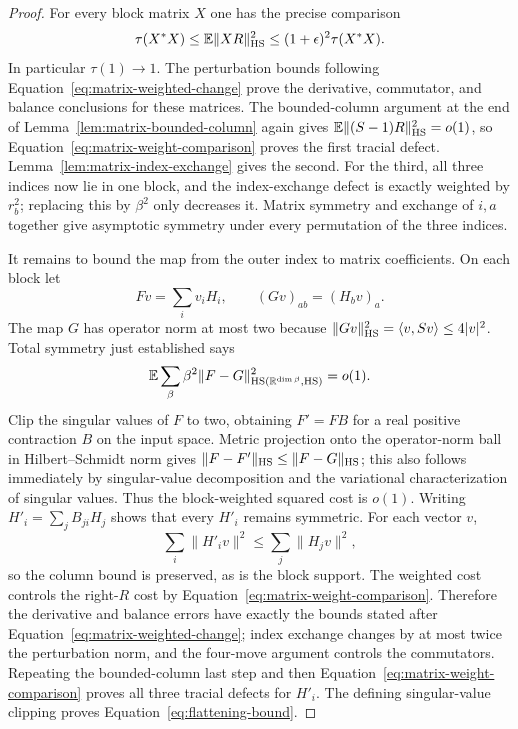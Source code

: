 \begin{proof}
For every block matrix $X$ one has the precise comparison
\begin{equation}\label{eq:matrix-weight-comparison}
 \tau(X^*X)\le\mathbb E\|XR\|_{\mathrm{HS}}^2
 \le(1+\epsilon)^2\tau(X^*X).
\end{equation}
In particular $\tau(1)\to1$.
The perturbation bounds following Equation~\eqref{eq:matrix-weighted-change}
prove the derivative, commutator, and balance conclusions for these
matrices.  The bounded-column argument at the end of
Lemma~\ref{lem:matrix-bounded-column} again gives
$\mathbb E\|(S-1)R\|_{\mathrm{HS}}^2=o(1)$, so
Equation~\eqref{eq:matrix-weight-comparison} proves the first tracial defect.
Lemma~\ref{lem:matrix-index-exchange} gives the second.  For the third,
all three indices now lie in one block, and the index-exchange defect
is exactly weighted by $r_b^2$; replacing this by $\beta^2$ only decreases
it.  Matrix symmetry and exchange of $i,a$ together give asymptotic
symmetry under every permutation of the three indices.

It remains to bound the map from the outer index to matrix coefficients.
On each block let
\[
 Fv=\sum_i v_iH_i,\qquad (Gv)_{ab}=(H_bv)_a.
\]
The map $G$ has operator norm at most two because
$\|Gv\|_{\mathrm{HS}}^2=\langle v,Sv\rangle\le4|v|^2$.
Total symmetry just established says
\[
 \mathbb E\sum_\beta\beta^2\|F-G\|_{\mathrm{HS}(\mathbb R^{\dim\beta},\mathrm{HS})}^2=o(1).
\]
Clip the singular values of $F$ to two, obtaining $F'=FB$ for a real
positive contraction $B$ on the input space.  Metric projection onto the
operator-norm ball in Hilbert--Schmidt norm gives
$\|F-F'\|_{\mathrm{HS}}\le\|F-G\|_{\mathrm{HS}}$; this also follows immediately by
singular-value decomposition and the variational characterization of
singular values.  Thus the block-weighted squared cost is $o(1)$.
Writing $H'_i=\sum_j B_{ji}H_j$ shows that every $H'_i$ remains symmetric.
For each vector $v$,
\[
 \sum_i\|H'_iv\|^2\le\sum_j\|H_jv\|^2,
\]
so the column bound is preserved, as is the block support.  The weighted
cost controls the right-$R$ cost by
Equation~\eqref{eq:matrix-weight-comparison}.  Therefore the derivative and
balance errors have exactly the bounds stated after
Equation~\eqref{eq:matrix-weighted-change}; index exchange changes by at
most twice the perturbation norm, and the four-move argument controls
the commutators.  Repeating the bounded-column last step and then
Equation~\eqref{eq:matrix-weight-comparison} proves all three tracial defects
for $H'_i$.  The defining singular-value clipping proves
Equation~\eqref{eq:flattening-bound}.
\end{proof}

